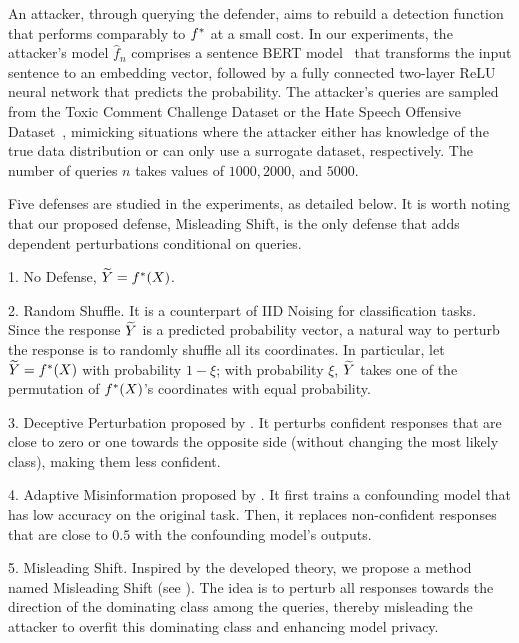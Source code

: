     An attacker, through querying the defender, aims to rebuild a detection function that performs comparably to $f^*$ at a small cost. In our experiments, the attacker's model $\hat{f}_n$ comprises a sentence BERT model~\citep{reimers2019sentence} that transforms the input sentence to an embedding vector, followed by a fully connected two-layer ReLU neural network that predicts the probability. The attacker's queries are sampled from the Toxic Comment Challenge Dataset or the Hate Speech Offensive Dataset~\citep{hateoffensive}, mimicking situations where the attacker either has knowledge of the true data distribution or can only use a surrogate dataset, respectively. The number of queries $n$ takes values of $1000, 2000$, and $5000$.


        Five defenses are studied in the experiments, as detailed below. It is worth noting that our proposed defense, Misleading Shift, is the only defense that adds dependent perturbations conditional on queries.

        1. No Defense, $\widetilde{Y}=f^*(X)$.

        2. Random Shuffle. It is a counterpart of IID Noising for classification tasks. Since the response $\widetilde{Y}$ is a predicted probability vector, a natural way to perturb the response is to randomly shuffle all its coordinates. In particular, let $\widetilde{Y}=f^*(X)$ with probability $1-\xi$; with probability $\xi$, $\widetilde{Y}$ takes one of the permutation of $f^*(X)$'s coordinates with equal probability.

        3. Deceptive Perturbation proposed by \citet{lee2019defending}. It perturbs confident responses that are close to zero or one towards the opposite side (without changing the most likely class), making them less confident.

        4. Adaptive Misinformation proposed by \citet{kariyappa2020defending}. It first trains a confounding model that has low accuracy on the original task. Then, it replaces non-confident responses that are close to $0.5$ with the confounding model's outputs.

        5.  Misleading Shift. Inspired by the developed theory, we propose a method named Misleading Shift (see ). The idea is to perturb all responses towards the direction of the dominating class among the queries, thereby misleading the attacker to overfit this dominating class and enhancing model privacy. 

